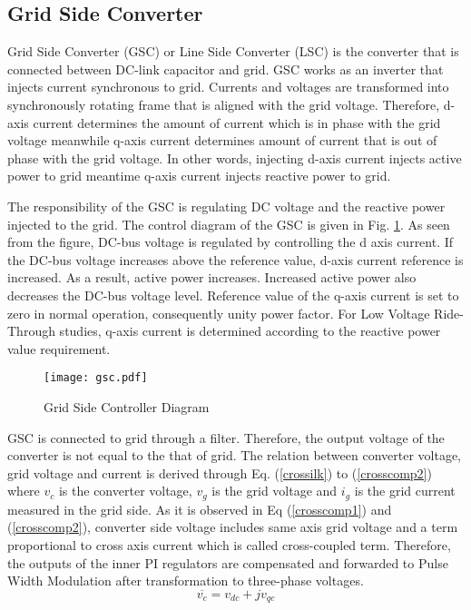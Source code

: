 \subsection{Grid Side Converter}
Grid Side Converter (GSC) or Line Side Converter (LSC) is the converter that is connected between DC-link capacitor and grid. GSC works as an inverter that injects current synchronous to grid. Currents and voltages are transformed into synchronously rotating frame that is aligned with the grid voltage. Therefore, d-axis current determines the amount of current which is in phase with the grid voltage meanwhile q-axis current determines amount of current that is out of phase with the grid voltage. In other words, injecting d-axis current injects active power to grid meantime q-axis current injects reactive power to grid.\par
The responsibility of the GSC is regulating DC voltage and the reactive power injected to the grid. The control diagram of the GSC is given in Fig. \ref{gsc}. As seen from the figure, DC-bus voltage is regulated by controlling the d axis current. If the DC-bus voltage increases above the reference value, d-axis current reference is increased. As a result, active power increases. Increased active power also decreases the DC-bus voltage level. Reference value of the q-axis current is set to zero in normal operation, consequently unity power factor. For Low Voltage Ride-Through studies, q-axis current is determined according to the reactive power value requirement. \cite{Orowska-Kowalska2014} \par
\begin{figure}[h!]
	\centering
	\texttt{[image: gsc.pdf]}
	\caption{Grid Side Controller Diagram}
	\label{gsc}
\end{figure}
GSC is connected to grid through a filter. Therefore, the output voltage of the converter is not equal to the that of grid. The relation between converter voltage, grid voltage and current is derived through Eq. (\ref{crossilk}) to (\ref{crosscomp2}) where $v_{c}$ is the converter voltage, $v_{g}$ is the grid voltage and  $i_{g}$ is the grid current measured in the grid side. As it is observed in Eq (\ref{crosscomp1}) and (\ref{crosscomp2}), converter side voltage includes same axis grid voltage and a term proportional to cross axis current which is called cross-coupled term. Therefore, the outputs of the inner PI regulators are compensated and forwarded to Pulse Width Modulation after transformation to three-phase voltages.
\begin{equation}
\overline{v_{c}}=v_{dc}+jv_{qc}
\label{crossilk}
\end{equation}
